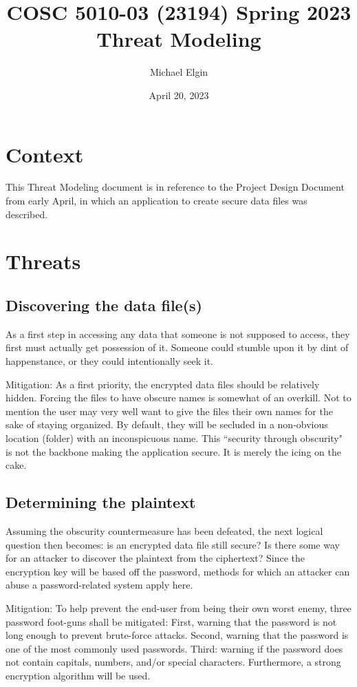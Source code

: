 \documentclass[12pt, letterpaper]{article}
\title{COSC 5010-03 (23194) Spring 2023 Threat Modeling}
\author{Michael Elgin}
\date{April 20, 2023}
\begin{document}
\maketitle

\section{Context}

This Threat Modeling document is in reference to the Project Design Document from early April, in which an application to create secure data files was described.

\section{Threats}

\subsection{Discovering the data file(s)}

As a first step in accessing any data that someone is not supposed to access, they first must actually get possession of it. Someone could stumble upon it by dint of happenstance, or they could intentionally seek it.

Mitigation: As a first priority, the encrypted data files should be relatively hidden. Forcing the files to have obscure names is somewhat of an overkill. Not to mention the user may very well want to give the files their own names for the sake of staying organized. By default, they will be secluded in a non-obvious location (folder) with an inconspicuous name. This ``security through obscurity" is not the backbone making the application secure. It is merely the icing on the cake.

\subsection{Determining the plaintext}

Assuming the obscurity countermeasure has been defeated, the next logical question then becomes: is an encrypted data file still secure? Is there some way for an attacker to discover the plaintext from the ciphertext? Since the encryption key will be based off the password, methods for which an attacker can abuse a password-related system apply here.

Mitigation: To help prevent the end-user from being their own worst enemy, three password foot-guns shall be mitigated: First, warning that the password is not long enough to prevent brute-force attacks. Second, warning that the password is one of the most commonly used passwords. Third: warning if the password does not contain capitals, numbers, and/or special characters. Furthermore, a strong encryption algorithm will be used.
\end{document}
